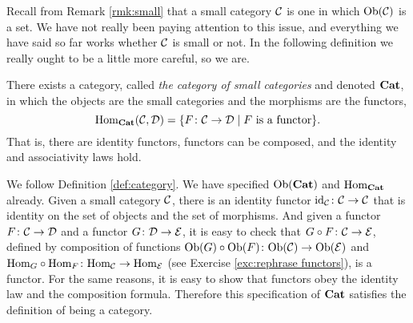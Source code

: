 \documentclass[CT4S-EN-RU]{subfiles}
\begin{document}
\begin{remarkRUS}
\end{remarkRUS}


\subsubsection{}\label{sec:cat of cats}

\begin{blockENG}
Recall from Remark \ref{rmk:small} that a small category $\mathcal{C}$ is one in which $\textnormal{Ob}(\mathcal{C})$ is a set. We have not really been paying attention to this issue, and everything we have said so far works whether $\mathcal{C}$ is small or not. In the following definition we really ought to be a little more careful, so we are. 
\end{blockENG}

\begin{blockRUS}
\end{blockRUS}

\begin{propositionENG}
There exists a category, called {\em the category of small categories} and denoted ${\bf Cat}$, in which the objects are the small categories and the morphisms are the functors, $$\textnormal{Hom}_{\bf Cat}(\mathcal{C},\mathcal{D})=\{F\colon\mathcal{C}\rightarrow\mathcal{D}{\;|\;} F \textnormal{ is a functor}\}.$$ That is, there are identity functors, functors can be composed, and the identity and associativity laws hold.
\end{propositionENG}

\begin{propositionRUS}
\end{propositionRUS}

\begin{proofENG}
We follow Definition \ref{def:category}. We have specified $\textnormal{Ob}({\bf Cat})$ and $\textnormal{Hom}_{\bf Cat}$ already. Given a small category $\mathcal{C}$, there is an identity functor $\textnormal{id}_\mathcal{C}\colon\mathcal{C}\rightarrow\mathcal{C}$ that is identity on the set of objects and the set of morphisms. And given a functor $F\colon\mathcal{C}\rightarrow\mathcal{D}$ and a functor $G\colon\mathcal{D}\rightarrow\mathcal{E}$, it is easy to check that $G\circ F\colon \mathcal{C}\rightarrow\mathcal{E}$, defined by composition of functions $\textnormal{Ob}(G)\circ\textnormal{Ob}(F)\colon\textnormal{Ob}(\mathcal{C})\rightarrow\textnormal{Ob}(\mathcal{E})$ and $\textnormal{Hom}_G\circ\textnormal{Hom}_F\colon\textnormal{Hom}_\mathcal{C}\rightarrow\textnormal{Hom}_\mathcal{E}$ (see Exercise \ref{exc:rephrase functors}), is a functor. For the same reasons, it is easy to show that functors obey the identity law and the composition formula. Therefore this specification of ${\bf Cat}$ satisfies the definition of being a category. 
\end{proofENG}
\end{document}
